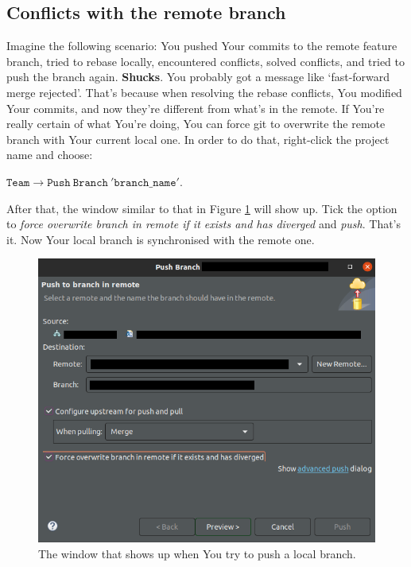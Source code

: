 \documentclass{article}
\begin{document}
\subsection{Conflicts with the remote branch}
\label{fig:push_conflict}

Imagine the following scenario: You pushed Your commits to the remote feature branch, tried to rebase locally, encountered conflicts, solved conflicts, and tried to push the branch again. \textbf{Shucks}. You probably got a message like `fast-forward merge rejected'. That's because when resolving the rebase conflicts, You modified Your commits, and now they're different from what's in the remote. If You're really certain of what You're doing, You can force git to overwrite the remote branch with Your current local one. In order to do that, right-click the project name and choose:\newline

$\mathtt{Team\rightarrow Push\ Branch\ 'branch\_name'}$.\newline 

After that, the window similar to that in Figure \ref{fig:force_push} will show up. Tick the option to \textit{force overwrite branch in remote if it exists and has diverged} and \textit{push}. That's it. Now Your local branch is synchronised with the remote one.

\begin{figure}
    \centering
    \includegraphics[scale=0.5]{force_push.png}
    \caption{The window that shows up when You try to push a local branch.}
    \label{fig:force_push}
\end{figure}
\end{document}
